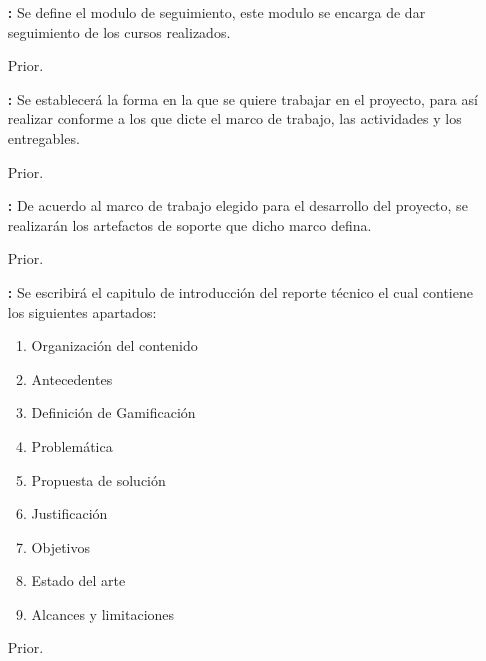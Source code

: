 \begin{multicols}{2}
\begin{itemize}
    	\item[\bf \ida] {\bf \desc:} Se define el modulo de seguimiento, este modulo se encarga de dar seguimiento de los cursos realizados.
        \item[Prior.] \Valor
\end{itemize}

\begin{itemize}
    	\item[\bf \ida] {\bf \desc:} Se establecerá la forma en la que se quiere trabajar en el proyecto, para así realizar conforme a los que dicte el marco de trabajo, las actividades y los entregables.
        \item[Prior.] \Valor
\end{itemize}

\begin{itemize}
    	\item[\bf \ida] {\bf \desc:} De acuerdo al marco de trabajo elegido para el desarrollo del proyecto, se realizarán los artefactos de soporte que dicho marco defina.
        \item[Prior.] \Valor
\end{itemize}

\end{multicols}

\begin{itemize}
    	\item[\bf \ida] {\bf \desc:} Se escribirá el capitulo de introducción del reporte técnico el cual contiene los siguientes apartados:
    	
    	\begin{enumerate}
    	    \item Organización del contenido
    	    \item Antecedentes
    	    \item Definición de Gamificación
    	    \item Problemática
    	    \item Propuesta de solución
    	    \item Justificación
    	    \item Objetivos
    	    \item Estado del arte
    	    \item Alcances y limitaciones
    	\end{enumerate}
    	
        \item[Prior.] \Valor
\end{itemize}

